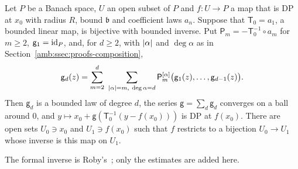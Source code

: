 \begin{lemma}\label{amb:lem:inverse}
Let $P$ be a Banach space, $U$ an open subset of $P$ and $f\colon U\to P$ a map that is DP at $x_0$ with radius $R$, bound $\mathfrak b$
and coefficient laws $a_n$. Suppose that $\mathsf T_0=a_1$, a bounded linear map, is bijective with bounded inverse. Put
$\mathsf P_m=-\mathsf T_0^{-1}\circ a_m$ for $m\ge2$, $\mathsf g_1=\mathrm{id}_P$, and, for $d\ge2$, with $\lvert \alpha\rvert$ and $\deg\alpha$ as in
Section~\ref{amb:ssec:proofs-composition},
\begin{equation}\label{amb:d:eq:inverse-recursion}
 \mathsf g_d(z)=\sum_{m=2}^d\ \sum_{\lvert \alpha\rvert=m,\ \deg\alpha=d}\mathsf P_m^{[\alpha]}\bigl(\mathsf g_1(z),\dots,\mathsf g_{d-1}(z)\bigr).
\end{equation}
Then $\mathsf g_d$ is a bounded law of degree $d$, the series $\mathsf g=\sum_d\mathsf g_d$ converges on a ball around $0$, and
$y\mapsto x_0+\mathsf g(\mathsf T_0^{-1}(y-f(x_0)))$ is DP at $f(x_0)$. There are open sets $U_0\ni x_0$ and $U_1\ni f(x_0)$ such
that $f$ restricts to a bijection $U_0\to U_1$ whose inverse is this map on $U_1$.
\end{lemma}

The formal inverse is Roby's~\cite[Th.~VI.3, Prop.~VI.8]{Ro}; only the estimates are added here.

